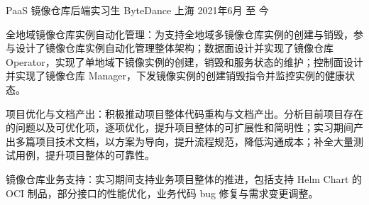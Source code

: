 

\begin{cventries}

  \cventry
    {PaaS 镜像仓库后端实习生} %
    {ByteDance} %
    {上海} %
    {2021年6月 至 今} %
    {
      \begin{cvitems} %
        \setlength\itemsep{1mm}
        \item {全地域镜像仓库实例自动化管理：为支持全地域多镜像仓库实例的创建与销毁，参与设计了镜像仓库实例自动化管理整体架构；数据面设计并实现了镜像仓库 Operator，实现了单地域下镜像实例的创建，销毁和服务状态的维护；控制面设计并实现了镜像仓库 Manager，下发镜像实例的创建销毁指令并监控实例的健康状态。}
        \item {项目优化与文档产出：积极推动项目整体代码重构与文档产出。分析目前项目存在的问题以及可优化项，逐项优化，提升项目整体的可扩展性和简明性；实习期间产出多篇项目技术文档，以方案为导向，提升流程规范，降低沟通成本；补全大量测试用例，提升项目整体的可靠性。}
        \item {镜像仓库业务支持：实习期间支持业务项目整体的推进，包括支持 Helm Chart 的 OCI 制品，部分接口的性能优化，业务代码 bug 修复与需求变更调整。}
      \end{cvitems}
    }




\end{cventries}
